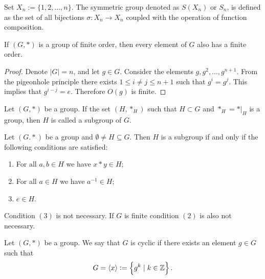 \documentclass[11pt,a4paper]{article}
\begin{document}
  \begin{definition}
    Set $X_n := \{1,2,\dots,n\}$. 
	  The symmetric group denoted as $S(X_n)$ or $S_n$, is defined as the set 
    of all bijections $\sigma \colon X_n \to X_n$ coupled with the operation 
    of function composition.
  \end{definition}

  \begin{proposition}
    If $(G, *)$ is a group of finite order, then every element of $G$ also has
    a finite order.
  \end{proposition}
  \begin{proof}
    Denote $|G|=n$, and let $g \in G$.
    Consider the elements $g, g^2, \dots, g^{n+1}$.
    From the pigeonhole principle there exists $1 \le i \neq j \le n+1$
    such that $g^i = g^j$. This implies that $g^{i-j} = e$.
  	Therefore $O(g)$ is finite.
  \end{proof}

  \begin{definition}[Subgroup]
    Let $(G, *)$ be a group. If the set $(H,*_H)$ such that $H \subset G$
    and $*_H = *\vert_H$ is a group, then $H$ is called a subgroup of $G$.
  \end{definition}

  \begin{proposition}
    Let $(G.*)$ be a group and $\emptyset \neq H \subseteq G$.
    Then $H$ is a subgroup if and only if the following conditions are
    satisfied:
    \begin{enumerate}
      \item[(1)] For all $a,b \in H$ we have $x * y \in H$;
      \item[(2)] For all $a \in H$ we have $a^{-1} \in H$;
      \item[(3)] $e \in H$.
    \end{enumerate}
  \end{proposition}
  \begin{remark}
    Condition $(3)$ is not necessary.
    If $G$ is finite condition $(2)$ is also not necessary.
  \end{remark}

  \begin{definition}
    Let $(G,*)$ be a group. We say that $G$ is cyclic if there exists
    an element $g \in G$ such that
    \[
      G = \langle x \rangle := \left\{g^k \mid k \in \mathbb{Z}\right\}.
    \]
  \end{definition}
\end{document}
